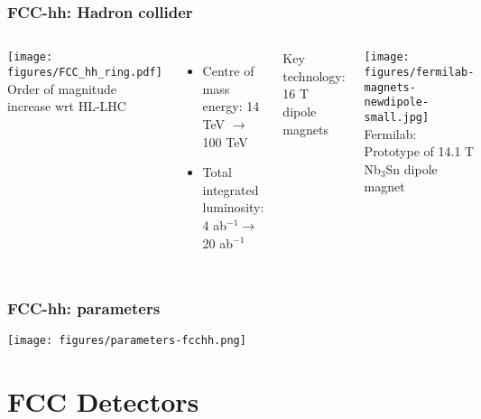 \documentclass[aspectratio=169]{beamer}
\newcommand{\bluetext}[1]{%
  \textcolor{myBlue}{#1}
}
\begin{document}
\begin{frame}
  \frametitle{FCC-hh: Hadron collider}
   \begin{columns}[c]
     \texttt{[image: figures/FCC\_hh\_ring.pdf]}\\

      \bluetext{Order of magnitude increase wrt HL-LHC}
      \begin{itemize}
      \item Centre of mass energy: 14 TeV $\rightarrow$ 100 TeV
      \item Total integrated luminosity: 4 ab$^{-1} \rightarrow$ 20 ab$^{-1}$
      \end{itemize}

      \bluetext{Key technology: 16 T dipole magnets}
      \begin{center}
        \texttt{[image: figures/fermilab-magnets-newdipole-small.jpg]}\\
         {\small{Fermilab: Prototype of 14.1 T Nb$_3$Sn dipole magnet}}
       \end{center}
   \end{columns}
\end{frame}


\begin{frame}
  \frametitle{FCC-hh: parameters}
     \texttt{[image: figures/parameters-fcchh.png]}\\
\end{frame}


%
%
\section{FCC Detectors}
\end{document}
